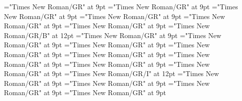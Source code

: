 \documentclass[gps1,twoside]{article}
\begin{document}
\font\spanspanowningentrysummarydefinitioncomplexformsnotsubentrycomplexformsnotsubentriessensesensessensesensesentrybefore="Times New Roman/GR" at 9pt
\font\spanowningentrysummarydefinitioncomplexformsnotsubentrycomplexformsnotsubentriessensesensessensesensesentryfirstchildbefore="Times New Roman/GR" at 9pt
\font\spanowningentrysummarydefinitioncomplexformsnotsubentrycomplexformsnotsubentriessensesensessensesensesentrylastchildafter="Times New Roman/GR" at 9pt
\font\nontrivialentryrootnontrivialentryrootnontrivialentryrootscomplexformsnotsubentrycomplexformsnotsubentriessensesensessensesensesentrybefore="Times New Roman/GR" at 9pt
\font\nontrivialentryrootscomplexformsnotsubentrycomplexformsnotsubentriessensesensessensesensesentrybefore="Times New Roman/GR" at 9pt
\font\nontrivialentryrootscomplexformsnotsubentrycomplexformsnotsubentriessensesensessensesensesentryafter="Times New Roman/GR" at 9pt
\font\nontrivialentryrootnontrivialentryrootscomplexformsnotsubentrycomplexformsnotsubentriessensesensessensesensesentry="Times New Roman/GR/B" at 12pt
\font\complexformsnotsubentrycomplexformsnotsubentrycomplexformsnotsubentriesentrybefore="Times New Roman/GR" at 9pt
\font\complexformsnotsubentriesentryafter="Times New Roman/GR" at 9pt
\font\complexformtypescomplexformsnotsubentrycomplexformsnotsubentriesentryafter="Times New Roman/GR" at 9pt
\font\spanspanreverseabbrcomplexformtypecomplexformtypescomplexformsnotsubentrycomplexformsnotsubentriesentrybefore="Times New Roman/GR" at 9pt
\font\spanspanheadwordcomplexformsnotsubentrycomplexformsnotsubentriesentrybefore="Times New Roman/GR" at 9pt
\font\spanheadwordcomplexformsnotsubentrycomplexformsnotsubentriesentrylastchildafter="Times New Roman/GR" at 9pt
\font\morphosyntaxanalysismorphosyntaxanalysismorphosyntaxanalysescomplexformsnotsubentrycomplexformsnotsubentriesentrybefore="Times New Roman/GR" at 9pt
\font\morphosyntaxanalysescomplexformsnotsubentrycomplexformsnotsubentriesentryafter="Times New Roman/GR" at 9pt
\font\morphosyntaxanalysismorphosyntaxanalysescomplexformsnotsubentrycomplexformsnotsubentriesentry="Times New Roman/GR/I" at 12pt
\font\spanspanpartofspeechmorphosyntaxanalysismorphosyntaxanalysescomplexformsnotsubentrycomplexformsnotsubentriesentrybefore="Times New Roman/GR" at 9pt
\font\spanpartofspeechmorphosyntaxanalysismorphosyntaxanalysescomplexformsnotsubentrycomplexformsnotsubentriesentrylastchildafter="Times New Roman/GR" at 9pt
\font\spanspanslotsmorphosyntaxanalysismorphosyntaxanalysescomplexformsnotsubentrycomplexformsnotsubentriesentrybefore="Times New Roman/GR" at 9pt
\font\slotsmorphosyntaxanalysismorphosyntaxanalysescomplexformsnotsubentrycomplexformsnotsubentriesentrybefore="Times New Roman/GR" at 9pt
\end{document}
